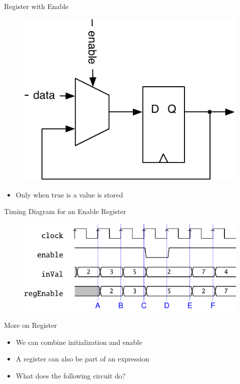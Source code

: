 \begin{frame}[fragile]{Register with Enable}
\begin{figure}
  \includegraphics[scale=\scale]{../figures/register-enable}
\end{figure}
\begin{itemize}
\item Only when  true is a value is stored
\end{itemize}

\end{frame}

\begin{frame}[fragile]{Timing Diagram for an Enable Register}
\begin{figure}
  \includegraphics[scale=1]{../figures/reg_en_wave}
\end{figure}
\end{frame}

\begin{frame}[fragile]{More on Register}
\begin{itemize}
\item We can combine initialization and enable
\end{itemize}
\begin{itemize}
\item A register can also be part of an expression
\item What does the following circuit do?
\end{itemize}
\end{frame}


